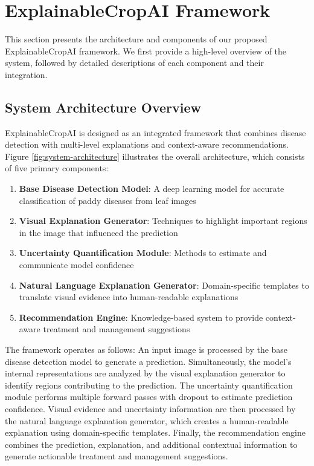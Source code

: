 \section{ExplainableCropAI Framework}

This section presents the architecture and components of our proposed ExplainableCropAI framework. We first provide a high-level overview of the system, followed by detailed descriptions of each component and their integration.

\subsection{System Architecture Overview}

ExplainableCropAI is designed as an integrated framework that combines disease detection with multi-level explanations and context-aware recommendations. Figure \ref{fig:system-architecture} illustrates the overall architecture, which consists of five primary components:

\begin{enumerate}
    \item \textbf{Base Disease Detection Model}: A deep learning model for accurate classification of paddy diseases from leaf images
    \item \textbf{Visual Explanation Generator}: Techniques to highlight important regions in the image that influenced the prediction
    \item \textbf{Uncertainty Quantification Module}: Methods to estimate and communicate model confidence
    \item \textbf{Natural Language Explanation Generator}: Domain-specific templates to translate visual evidence into human-readable explanations
    \item \textbf{Recommendation Engine}: Knowledge-based system to provide context-aware treatment and management suggestions
\end{enumerate}


The framework operates as follows: An input image is processed by the base disease detection model to generate a prediction. Simultaneously, the model's internal representations are analyzed by the visual explanation generator to identify regions contributing to the prediction. The uncertainty quantification module performs multiple forward passes with dropout to estimate prediction confidence. Visual evidence and uncertainty information are then processed by the natural language explanation generator, which creates a human-readable explanation using domain-specific templates. Finally, the recommendation engine combines the prediction, explanation, and additional contextual information to generate actionable treatment and management suggestions.

